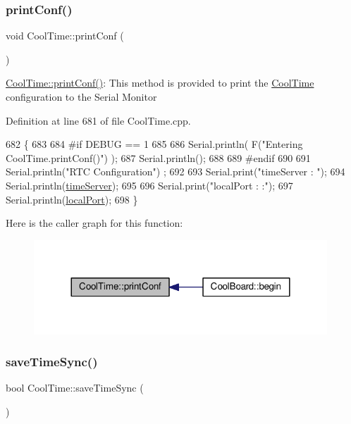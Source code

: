 \subsubsection{\texorpdfstring{print\+Conf()}{printConf()}}
{\footnotesize\ttfamily void Cool\+Time\+::print\+Conf (\begin{DoxyParamCaption}{ }\end{DoxyParamCaption})}

\hyperlink{class_cool_time_af355e7f9b3898211cd2ff25eab5933b1}{Cool\+Time\+::print\+Conf()}\+: This method is provided to print the \hyperlink{class_cool_time}{Cool\+Time} configuration to the Serial Monitor 

Definition at line 681 of file Cool\+Time.\+cpp.


\begin{DoxyCode}
682 \{
683 
684 \textcolor{preprocessor}{#if DEBUG == 1}
685 
686     Serial.println( F(\textcolor{stringliteral}{"Entering CoolTime.printConf()"}) );
687     Serial.println();
688 
689 \textcolor{preprocessor}{#endif }
690 
691     Serial.println(\textcolor{stringliteral}{"RTC Configuration"}) ;
692 
693     Serial.print(\textcolor{stringliteral}{"timeServer : "});
694     Serial.println(\hyperlink{class_cool_time_ad2b9858f399108cb440dd1e908916f04}{timeServer});
695     
696     Serial.print(\textcolor{stringliteral}{"localPort : :"});
697     Serial.println(\hyperlink{class_cool_time_a2f777da44d7ba678be8185299e9b49d1}{localPort});
698 \}
\end{DoxyCode}
Here is the caller graph for this function\+:\nopagebreak
\begin{figure}[H]
\begin{center}
\leavevmode
\includegraphics[width=312pt]{d6/d49/class_cool_time_af355e7f9b3898211cd2ff25eab5933b1_icgraph}
\end{center}
\end{figure}
\mbox{\label{class_cool_time_ae9658c9b377510d469e3b88edf33ee85}} 
\subsubsection{\texorpdfstring{save\+Time\+Sync()}{saveTimeSync()}}
{\footnotesize\ttfamily bool Cool\+Time\+::save\+Time\+Sync (\begin{DoxyParamCaption}{ }\end{DoxyParamCaption})}

